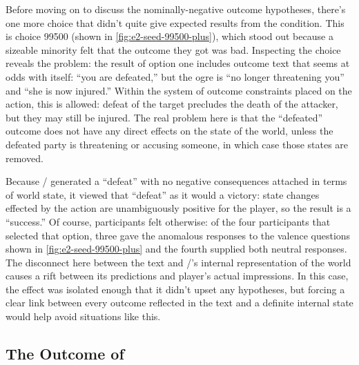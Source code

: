 Before moving on to discuss the nominally-negative outcome hypotheses, there's one more choice that didn't quite give expected results from the \unxs{} condition.
%
This is choice 99500 (shown in \cref{fig:e2-seed-99500-plus}), which stood out because a sizeable minority felt that the outcome they got was bad.
%
Inspecting the choice reveals the problem: the result of option one includes outcome text that seems at odds with itself: ``you are defeated,'' but the ogre is ``no longer threatening you'' and ``she is now injured.''
%
Within the system of outcome constraints placed on the  action, this is allowed: defeat of the target precludes the death of the attacker, but they may still be injured.
%
The real problem here is that the ``defeated'' outcome does not have any direct effects on the state of the world, unless the defeated party is threatening or accusing someone, in which case those states are removed.


Because \dunyazad/ generated a ``defeat'' with no negative consequences attached in terms of world state, it viewed that ``defeat'' as it would a victory: state changes effected by the action are unambiguously positive for the player, so the result is a ``success.''
%
Of course, participants felt otherwise: of the four participants that selected that option, three gave the anomalous responses to the valence questions shown in \cref{fig:e2-seed-99500-plus} and the fourth supplied both neutral responses.
%
The disconnect here between the text and \dunyazad/'s internal representation of the world causes a rift between its predictions and player's actual impressions.
%
In this case, the effect was isolated enough that it didn't upset any hypotheses, but forcing a clear link between every outcome reflected in the text and a definite internal state would help avoid situations like this.


\subsection{The Outcome of }


